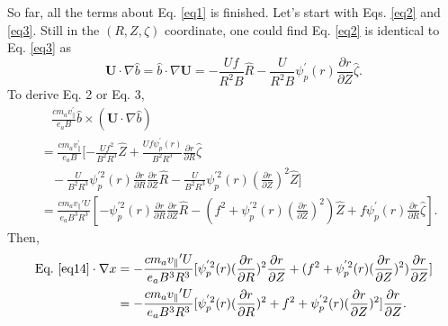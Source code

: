 \documentclass[12pt]{article}
\begin{document}
\begin{CJK*}{UTF8}{gbsn}
So far, all the terms about Eq. \ref{eq1} is finished. Let's start with Eqs. \ref{eq2} and \ref{eq3}.
Still in the $(R,Z,\zeta)$ coordinate, one could find Eq. \ref{eq2} is identical to Eq. \ref{eq3} as
\begin{equation}
    \mathbf{U}\cdot\nabla\hat{b} = \hat{b}\cdot\nabla\mathbf{U} = - \frac{Uf}{R^2B}\hat{R} - \frac{U}{R^2B}\psi_p^{'}(r)\frac{\partial r}{\partial Z}\hat{\zeta}.
\end{equation}
To derive Eq. 2 or Eq. 3, 
\begin{equation}
\begin{split}
    &\ \ \ \  \frac{cm_av_{\parallel}^{'}}{e_aB} \hat{b} \times (\mathbf{U}\cdot\nabla\hat{b}) \\&= \frac{cm_av_{\parallel}^{'}}{e_aB}
    [-\frac{Uf^2}{B^2R^3}\hat{Z} + \frac{Uf\psi^{'}_p(r)}{B^2R^3}\frac{\partial r}{\partial R}\hat{\zeta}\\
     &\ \ \ \ -\frac{U}{B^2R^3}\psi_p^{'2}(r)\frac{\partial r}{\partial R}\frac{\partial r}{\partial Z}\hat{R}
     -\frac{U}{B^2R^3}\psi_p^{'2}(r)(\frac{\partial r}{\partial Z})^2\hat{Z}]\\
    &=\frac{cm_av_{\parallel}{'}U}{e_aB^3R^3}[-\psi_p^{'2}(r)\frac{\partial r}{\partial R}\frac{\partial r}{\partial Z}\hat{R}
     -(f^2 + \psi_p^{'2}(r)(\frac{\partial r}{\partial Z})^2)\hat{Z} + f\psi_p^{'}(r)\frac{\partial r}{\partial R}\hat{\zeta}].\label{eq14}
\end{split}
\end{equation}
Then, 
\begin{equation}
\begin{split}
    \textrm{Eq.}\ \ref{eq14} \cdot\nabla x &= -\frac{cm_av_{\parallel}{'}U}{e_aB^3R^3}[\psi_p^{'2}(r)(\frac{\partial r}{\partial R})^2\frac{\partial r}{\partial Z}
    +(f^2 + \psi_p^{'2}(r)(\frac{\partial r}{\partial Z})^2)\frac{\partial r}{\partial Z}]\\
    &= -\frac{cm_av_{\parallel}{'}U}{e_aB^3R^3}[\psi_p^{'2}(r)(\frac{\partial r}{\partial R})^2
       +f^2 + \psi_p^{'2}(r)(\frac{\partial r}{\partial Z})^2]\frac{\partial r}{\partial Z}.
\end{split}
\end{equation}


\end{CJK*}
\end{document}
